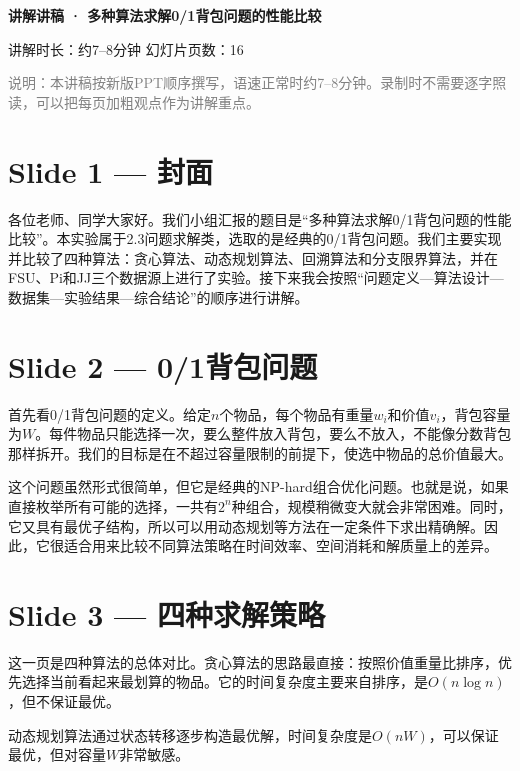 \documentclass[12pt,a4paper]{ctexart}
\newcommand{\note}[1]{\textcolor{gray}{\small #1}}
\begin{document}
\begin{center}
{\Large \textbf{讲解讲稿 · 多种算法求解0/1背包问题的性能比较}}

\vspace{0.3cm}
讲解时长：约7--8分钟 \quad 幻灯片页数：16
\end{center}

\vspace{0.6cm}

\note{说明：本讲稿按新版PPT顺序撰写，语速正常时约7--8分钟。录制时不需要逐字照读，可以把每页加粗观点作为讲解重点。}

\section*{Slide 1 — 封面}

各位老师、同学大家好。我们小组汇报的题目是“多种算法求解0/1背包问题的性能比较”。本实验属于2.3问题求解类，选取的是经典的0/1背包问题。我们主要实现并比较了四种算法：贪心算法、动态规划算法、回溯算法和分支限界算法，并在FSU、Pi和JJ三个数据源上进行了实验。接下来我会按照“问题定义—算法设计—数据集—实验结果—综合结论”的顺序进行讲解。

\section*{Slide 2 — 0/1背包问题}

首先看0/1背包问题的定义。给定$n$个物品，每个物品有重量$w_i$和价值$v_i$，背包容量为$W$。每件物品只能选择一次，要么整件放入背包，要么不放入，不能像分数背包那样拆开。我们的目标是在不超过容量限制的前提下，使选中物品的总价值最大。

这个问题虽然形式很简单，但它是经典的NP-hard组合优化问题。也就是说，如果直接枚举所有可能的选择，一共有$2^n$种组合，规模稍微变大就会非常困难。同时，它又具有最优子结构，所以可以用动态规划等方法在一定条件下求出精确解。因此，它很适合用来比较不同算法策略在时间效率、空间消耗和解质量上的差异。

\section*{Slide 3 — 四种求解策略}

这一页是四种算法的总体对比。贪心算法的思路最直接：按照价值重量比排序，优先选择当前看起来最划算的物品。它的时间复杂度主要来自排序，是$O(n\log n)$，但不保证最优。

动态规划算法通过状态转移逐步构造最优解，时间复杂度是$O(nW)$，可以保证最优，但对容量$W$非常敏感。
\end{document}
